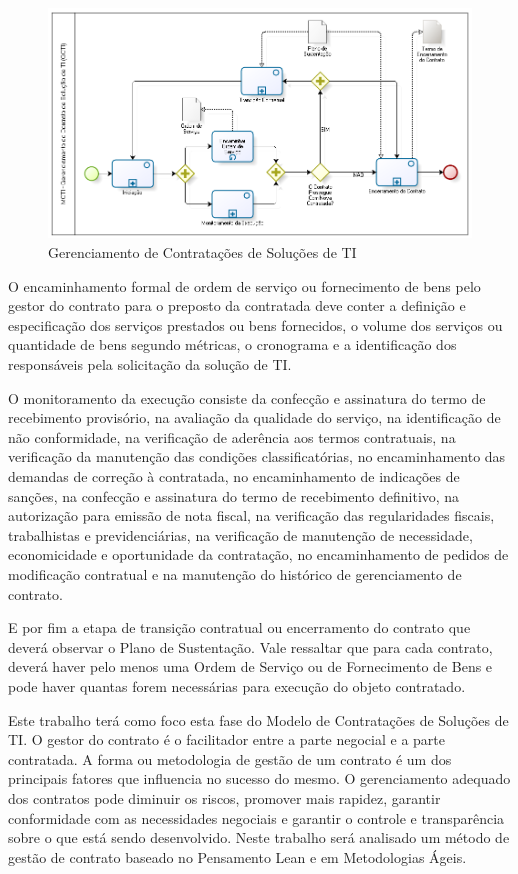 \begin{figure}[h]
		\centering
		\label{fig05}
			\includegraphics[scale=0.6]{figuras/GCTI.png}
		\caption{Gerenciamento de Contratações de Soluções de TI   \cite{mcti}}
\end{figure}

O encaminhamento formal de ordem de serviço ou fornecimento de bens pelo gestor do contrato para o preposto da contratada deve conter a definição e especificação dos serviços prestados ou bens fornecidos, o volume dos serviços ou quantidade de bens segundo métricas, o cronograma e a identificação dos responsáveis pela solicitação da solução de TI. 

O monitoramento da execução consiste da confecção e assinatura do termo de recebimento provisório, na avaliação da qualidade do serviço, na identificação de não conformidade, na verificação de aderência aos termos contratuais, na verificação da manutenção das condições classificatórias, no encaminhamento das demandas de correção à contratada, no encaminhamento de indicações de sanções, na confecção e assinatura do termo de recebimento definitivo, na autorização para emissão de nota fiscal, na verificação das regularidades fiscais, trabalhistas e previdenciárias, na verificação de manutenção de necessidade, economicidade e oportunidade da contratação, no encaminhamento de pedidos de modificação contratual e na manutenção do histórico de gerenciamento de contrato. 

E por fim a etapa de transição contratual ou encerramento do contrato que deverá observar o Plano de Sustentação. Vale ressaltar que para cada contrato, deverá haver pelo menos uma Ordem de Serviço ou de Fornecimento de Bens e pode haver quantas forem necessárias para execução do objeto contratado.

Este trabalho terá como foco esta fase do Modelo de Contratações de Soluções de TI. O gestor do contrato é o facilitador entre a parte negocial e a parte contratada. A forma ou metodologia de gestão de um contrato é um dos principais fatores que influencia no sucesso do mesmo. O gerenciamento adequado dos contratos pode diminuir os riscos, promover mais rapidez, garantir conformidade com as necessidades negociais e garantir o controle e transparência sobre o que está sendo desenvolvido. Neste trabalho será analisado um método de gestão de contrato baseado no Pensamento Lean e em Metodologias Ágeis.

